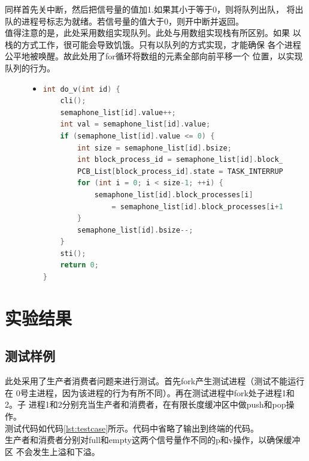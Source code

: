 \documentclass[a4paper]{article}
\begin{document}
    同样首先关中断，然后把信号量的值加1.如果其小于等于0，则将队列出队，
    将出队的进程号标志为就绪。若信号量的值大于0，则开中断并返回。\\ 

    值得注意的是，此处采用数组实现队列。此处与用数组实现栈有所区别。如果
    以栈的方式工作，很可能会导致饥饿。只有以队列的方式实现，才能确保
    各个进程公平地被唤醒。故此处用了for循环将数组的元素全部向前平移一个
    位置，以实现队列的行为。\\ 
    \begin{figure}[!hbt]
    \begin{itemize}
    \item[] \begin{lstlisting}[language=C, label=lst:voperation, caption=V操作的实现]
int do_v(int id) {
    cli();
    semaphone_list[id].value++;
    int val = semaphone_list[id].value;
    if (semaphone_list[id].value <= 0) {
        int size = semaphone_list[id].bsize;
        int block_process_id = semaphone_list[id].block_processes[0];
        PCB_List[block_process_id].state = TASK_INTERRUPTIBLE;
        for (int i = 0; i < size-1; ++i) {
            semaphone_list[id].block_processes[i] 
                = semaphone_list[id].block_processes[i+1];
        }
        semaphone_list[id].bsize--;
    }
    sti();
    return 0;
}
    \end{lstlisting}
    \end{itemize}
    \end{figure}
\section{实验结果}
\subsection{测试样例}
此处采用了生产者消费者问题来进行测试。首先fork产生测试进程（测试不能运行在
0号主进程，因为该进程的行为有所不同）。再在测试进程中fork处子进程1和2。子
进程1和2分别充当生产者和消费者，在有限长度缓冲区中做push和pop操作。\\ 

测试代码如代码\ref{lst:testcase}所示。代码中省略了输出到终端的代码。\\ 

生产者和消费者分别对full和empty这两个信号量作不同的p和v操作，以确保缓冲区
不会发生上溢和下溢。\\ 
\end{document}
